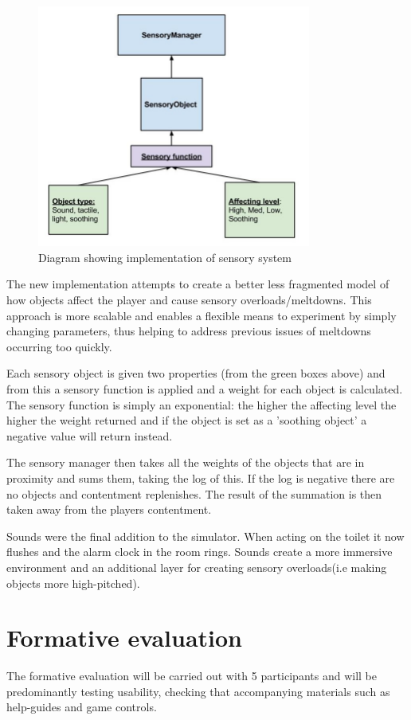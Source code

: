 \documentclass[11pt]{report}
\begin{document}
\begin{figure}[H]
\centering
\includegraphics[width=90mm]{images/sensoryobjects.jpg}
\caption{Diagram showing implementation of sensory system}
\label{sensorysystem}
\end{figure}

The new implementation attempts to create a better less fragmented model of how objects affect the player and cause sensory overloads/meltdowns. This approach is more scalable and enables a flexible means to experiment by simply changing parameters, thus helping to address previous issues of meltdowns occurring too quickly.

Each sensory object is given two properties (from the green boxes above) and from this a sensory function is applied and a weight for each object is calculated. The sensory function is simply an exponential: the higher the affecting level the higher the weight returned and if the object is set as a 'soothing object' a negative value will return instead. 

The sensory manager then takes all the weights of the objects that are in proximity and sums them, taking the log of this. If the log is negative there are no objects and contentment replenishes. The result of the summation is then taken away from the players contentment. 

Sounds were the final addition to the simulator. When acting on the toilet it now flushes and the alarm clock in the room rings. Sounds create a more immersive environment and an additional layer for creating sensory overloads(i.e making objects more high-pitched). 

\chapter{Formative evaluation}
The formative evaluation will be carried out with 5 participants and will be predominantly testing usability, checking that accompanying materials such as help-guides and game controls.
\end{document}
